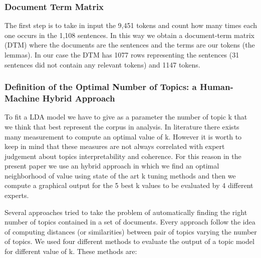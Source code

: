 \documentclass[]{book}
\theoremstyle{definition}
\theoremstyle{definition}
\theoremstyle{definition}
\theoremstyle{remark}
\begin{document}
\subsubsection*{Document Term Matrix}\label{document-term-matrix}

The first step is to take in input the 9,451 tokens and count how many
times each one occurs in the 1,108 sentences. In this way we obtain a
document-term matrix (DTM) where the documents are the sentences and the
terms are our tokens (the lemmas). In our case the DTM has 1077 rows
representing the sentences (31 sentences did not contain any relevant
tokens) and 1147 tokens.

\subsubsection*{Definition of the Optimal Number of Topics: a
Human-Machine Hybrid
Approach}\label{definition-of-the-optimal-number-of-topics-a-human-machine-hybrid-approach}

To fit a LDA model we have to give as a parameter the number of topic k
that we think that best represent the corpus in analysis. In literature
there exists many measurement to compute an optimal value of k. However
it is worth to keep in mind that these measures are not always
correlated with expert judgement about topics interpretability and
coherence. For this reason in the present paper we use an hybrid
approach in which we find an optimal neighborhood of value using state
of the art k tuning methods and then we compute a graphical output for
the 5 best k values to be evaluated by 4 different experts.

Several approaches tried to take the problem of automatically finding
the right number of topics contained in a set of documents. Every
approach follow the idea of computing distances (or similarities)
between pair of topics varying the number of topics. We used four
different methods to evaluate the output of a topic model for different
value of k. These methods are:
\end{document}
